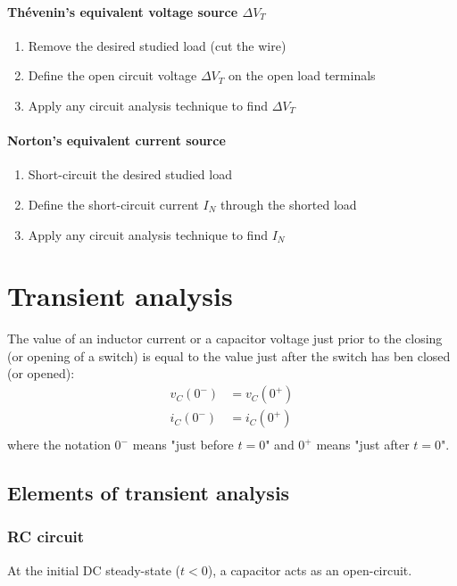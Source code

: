 \documentclass[10pt, twocolumn]{article}
\begin{document}
\paragraph{Thévenin's equivalent voltage source \(\Delta V_T\)}
\begin{enumerate}
  \item Remove the desired studied load (cut the wire)
  \item Define the open circuit voltage \(\Delta V_T\) on the open load terminals
  \item Apply any circuit analysis technique to find \(\Delta V_T\)
\end{enumerate}


\paragraph{Norton's equivalent current source}
\begin{enumerate}
  \item Short-circuit the desired studied load
  \item Define the short-circuit current \(I_N\) through the shorted load
  \item Apply any circuit analysis technique to find \(I_N\)
\end{enumerate}


\section{Transient analysis}
The value of an inductor current or a capacitor voltage just prior to the closing (or opening of a switch) is equal to the value just after the switch has ben closed (or opened):
\begin{align*}
  v_C(0^-) & = v_C(0^+) \\
  i_C(0^-) & = i_C(0^+) \\
\end{align*}
where the notation \(0^-\) means "just before \(t = 0\)" and \(0^+\) means "just after \(t = 0\)".


\subsection{Elements of transient analysis}
\subsubsection{RC circuit}
At the initial DC steady-state (\(t < 0\)), a capacitor acts as an open-circuit.
\end{document}
